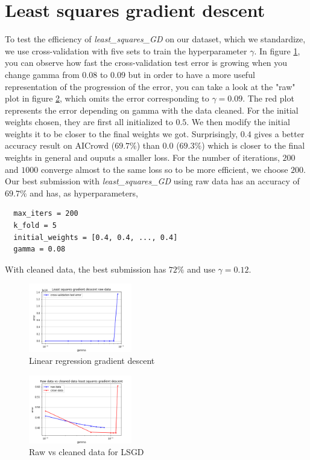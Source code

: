 \documentclass[11pt, a4paper, twoside]{article}
\begin{document}
\section{Least squares gradient descent}
To test the efficiency of \textit{least\_squares\_GD} on our dataset, 
which we standardize, we use cross-validation with five sets 
to train the hyperparameter $\gamma$.
In figure \ref{fig:lsgd}, 
you can observe how fast the cross-validation test error is growing 
when you change gamma from $0.08$ to $0.09$ 
but in order to have a more useful representation of the progression of the error, 
you can take a look at the "raw" plot in figure \ref{fig:raw_clean_lsgd}, 
which omits the error corresponding to $\gamma = 0.09$.
The red plot represents the error depending on gamma with the data cleaned.
For the initial weights chosen, they are first all initialized to $0.5$. 
We then modify the initial weights it to be closer to the final weights we got. 
Surprisingly, $0.4$ gives a better accuracy result on AICrowd ($69.7\%$) 
than $0.0$ ($69.3\%$) which is closer to the final weights 
in general and ouputs a smaller loss.
For the number of iterations, $200$ and $1000$ converge almost to the same loss 
so to be more efficient, we choose $200$.
Our best submission with \textit{least\_squares\_GD} using raw data 
has an accuracy of $69.7\%$ and has, as hyperparameters,
\begin{lstlisting}
  max_iters = 200
  k_fold = 5
  initial_weights = [0.4, 0.4, ..., 0.4]
  gamma = 0.08
\end{lstlisting}
With cleaned data, the best submission has $72\%$ and use $\gamma = 0.12$.

\begin{figure}
  \includegraphics[width=0.4\textwidth]{plots/raw_data_least_squares_GD.png}
  \caption{Linear regression gradient descent}
  \label{fig:lsgd}
\end{figure}

\begin{figure}
  \includegraphics[width=0.4\textwidth]{plots/raw_vs_clean_lsgd.png}
  \caption{Raw vs cleaned data for LSGD}
    \label{fig:raw_clean_lsgd}
\end{figure}
\end{document}
